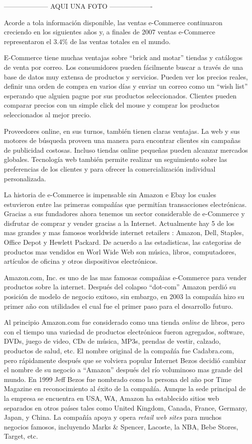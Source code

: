 -------------------- AQUI UNA FOTO -------------------

Acorde a tola información disponible, las ventas e-Commerce continuaron creciendo en los siguientes años y, a finales de 2007 ventas e-Commerce representaron el 3.4\% de las ventas totales en el mundo.

E-Commerce tiene muchas ventajas sobre “brick and motar” tiendas y catálogos de venta por correo. Los consumidores pueden fácilmente buscar a través de una base de datos muy extensa de productos y servicios. Pueden ver los precios reales, definir una orden de compra en varios días y enviar un correo como un “wish list” esperando que alguien pague por sus productos seleccionados. Clientes pueden comparar precios con un simple click del mouse y comprar los productos seleccionados al mejor precio.

Proveedores online, en sus turnos, también tienen claras ventajas. La web y sus motores de búsqueda proveen una manera para encontrar clientes sin campañas de publicidad costosas. Incluso tiendas online pequeñas pueden alcanzar mercados globales. 
Tecnología web también permite realizar un seguimiento sobre las preferencias de los clientes y para ofrecer la comercialización individual personalizada.

La historia de e-Commerce is impensable sin Amazon e Ebay los cuales estuvieron entre las primeras compañías que permitían transacciones electrónicas. Gracias a sus fundadores ahora tenemos un sector considerable de e-Commerce y disfrutar de comprar y vender gracias a la Internet. Actualmente hay 5 de los mas grandes y mas famosos worldwide internet retailers : Amazon, Dell, Staples, Office Depot y Hewlett Packard. De acuerdo a las estadisticas, las categorias de productos mas vendidos en Worl Wide Web son música, libros, computadores, artículos de oficina y otros dispositivos electrónicos.

Amazon.com, Inc. es uno de las mas famosas compañias e-Commerce  para vender productos sobre la internet. Después del colapso “dot-com” Amazon perdió su posición de modelo de negocio exitoso, sin embargo, en 2003 la compañía hizo su primer año con utilidades el cual fue el primer paso para el desarrollo futuro.

Al principio Amazon.com fue considerado como una tienda \textit{online} de libros, pero con el tiempo una variedad de productos electrónicos fueron agregados, software, DVDs, juego de video, CDs de música, MP3s, prendas de vestir, calzado, productos de salud, etc. El nombre original de la compañía fue Cadabra.com, pero rápidamente después que se volviera popular Internet Bezos decidió cambiar el nombre de su negocio a “Amazon” después del río voluminoso mas grande del mundo. En 1999 Jeff Bezos fue nombrado como la persona del año por Time Magazine en reconocimiento al éxito de la compañía. Aunque la sede principal de la empresa se encuentra en USA, WA, Amazon ha establecido sitios web separados en otros países tales como United Kingdom, Canada, France, Germany, Japan, y China. La compañía apoya y opera \textit{retail web sites} para muchos negocios famosos, incluyendo Marks \& Spencer, Lacoste, la NBA, Bebe Stores, Target, etc.

